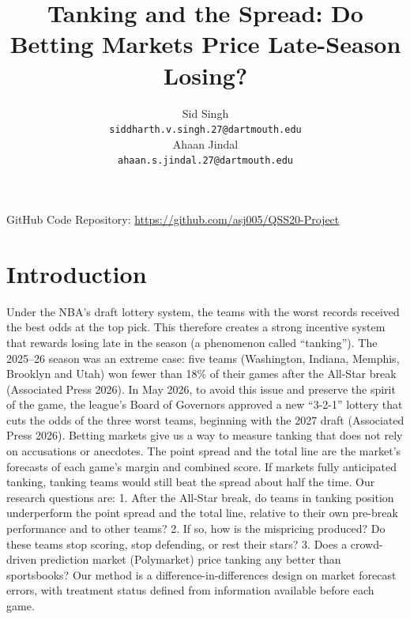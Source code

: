 \documentclass[12pt,letterpaper]{article}
\title{Tanking and the Spread: Do Betting Markets Price Late-Season Losing?}
\author{Sid Singh \\
  {\tt siddharth.v.singh.27@dartmouth.edu} \\\And
  Ahaan Jindal \\
  {\tt ahaan.s.jindal.27@dartmouth.edu}}
\begin{document}
\maketitle


\vspace{-1cm}
\begin{center}
GitHub Code Repository: \url{https://github.com/asj005/QSS20-Project}
\end{center}

\maketoc



\section{Introduction}

Under the NBA's draft lottery system, the teams with the worst records received the best
odds at the top pick. This therefore creates a strong incentive system that rewards losing
late in the season (a phenomenon called ``tanking''). The 2025--26 season was an extreme
case: five teams (Washington, Indiana, Memphis, Brooklyn and Utah) won fewer than 18\%
of their games after the All-Star break (Associated Press 2026). In May 2026, to avoid this
issue and preserve the spirit of the game, the league's Board of Governors approved a new
``3-2-1'' lottery that cuts the odds of the three worst teams, beginning with the 2027 draft
(Associated Press 2026).
Betting markets give us a way to measure tanking that does not rely on accusations or
anecdotes. The point spread and the total line are the market's forecasts of each game's
margin and combined score. If markets fully anticipated tanking, tanking teams would still
beat the spread about half the time. Our research questions are:
1. After the All-Star break, do teams in tanking position underperform the point spread
and the total line, relative to their own pre-break performance and to other teams?
2. If so, how is the mispricing produced? Do these teams stop scoring, stop defending,
or rest their stars?
3. Does a crowd-driven prediction market (Polymarket) price tanking any better than
sportsbooks?
Our method is a difference-in-differences design on market forecast errors, with treatment
status defined from information available before each game.
\end{document}
